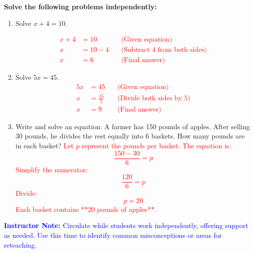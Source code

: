 \documentclass[12pt]{article}
\begin{document}
\begin{tcolorbox}[colframe=black!60, colback=white, 
coltitle=black, colbacktitle=black!15, fonttitle=\bfseries\Large, 
title=Independent Practice, halign title=center, left=10pt, right=10pt, top=10pt, bottom=15pt]
\textbf{Solve the following problems independently:}
\begin{enumerate}[itemsep=3em]
    \item Solve \( x + 4 = 10 \). 

    \textcolor{red}{
    \begin{align*}
    x + 4 &= 10  \quad &\text{(Given equation)} \\
    x &= 10 - 4  \quad &\text{(Subtract 4 from both sides)} \\
    x &= 6  \quad &\text{(Final answer)}
    \end{align*}
    }
    \item Solve \( 5x = 45 \). 
    \textcolor{red}{
    \begin{align*}
    5x &= 45  \quad &\text{(Given equation)} \\
    x &= \frac{45}{5}  \quad &\text{(Divide both sides by 5)} \\
    x &= 9  \quad &\text{(Final answer)}
    \end{align*}
    }
    \item Write and solve an equation: A farmer has 150 pounds of apples. After selling 30 pounds, he divides the rest equally into 6 baskets. How many pounds are in each basket? 
    \textcolor{red}{
    Let \( p \) represent the pounds per basket. The equation is:
    \[
    \frac{150 - 30}{6} = p
    \]
    Simplify the numerator:
    \[
    \frac{120}{6} = p
    \]
    Divide:
    \[
    p = 20
    \]
    Each basket contains **20 pounds of apples**.
    }
\end{enumerate}

\textcolor{blue}{\textbf{Instructor Note:} Circulate while students work independently, offering support as needed. Use this time to identify common misconceptions or areas for reteaching.}
\end{tcolorbox}
\end{document}

